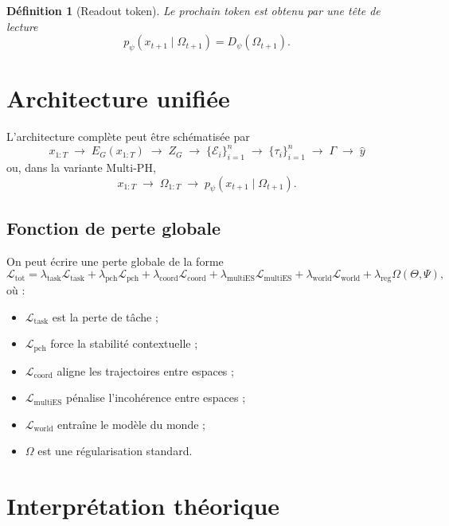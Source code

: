 \documentclass[11pt,a4paper]{article}
\newtheorem{definition}{Définition}[section]
\newcommand{\E}{\mathcal E}
\newcommand{\1}{\mathbf 1}
\begin{document}
\begin{definition}[Readout token]
Le prochain token est obtenu par une tête de lecture
\[
p_\psi(x_{t+1}\mid \Omega_{t+1})
=
D_\psi(\Omega_{t+1}).
\]
\end{definition}

\section{Architecture unifiée}

L'architecture complète peut être schématisée par
\[
x_{1:T}
\;\longrightarrow\;
E_G(x_{1:T})
\;\longrightarrow\;
Z_G
\;\longrightarrow\;
\{\E_i\}_{i=1}^n
\;\longrightarrow\;
\{\tau_i\}_{i=1}^n
\;\longrightarrow\;
\Gamma
\;\longrightarrow\;
\hat y
\]
ou, dans la variante Multi-PH,
\[
x_{1:T}
\;\longrightarrow\;
\Omega_{1:T}
\;\longrightarrow\;
p_\psi(x_{t+1}\mid \Omega_{t+1}).
\]

\subsection{Fonction de perte globale}

On peut écrire une perte globale de la forme
\[
\mathcal L_{\mathrm{tot}}
=
\lambda_{\mathrm{task}}\mathcal L_{\mathrm{task}}
+
\lambda_{\mathrm{pch}}\mathcal L_{\mathrm{pch}}
+
\lambda_{\mathrm{coord}}\mathcal L_{\mathrm{coord}}
+
\lambda_{\mathrm{multiES}}\mathcal L_{\mathrm{multiES}}
+
\lambda_{\mathrm{world}}\mathcal L_{\mathrm{world}}
+
\lambda_{\mathrm{reg}}\Omega(\Theta,\Psi),
\]
où :
\begin{itemize}[leftmargin=2em]
    \item \(\mathcal L_{\mathrm{task}}\) est la perte de tâche ;
    \item \(\mathcal L_{\mathrm{pch}}\) force la stabilité contextuelle ;
    \item \(\mathcal L_{\mathrm{coord}}\) aligne les trajectoires entre espaces ;
    \item \(\mathcal L_{\mathrm{multiES}}\) pénalise l'incohérence entre espaces ;
    \item \(\mathcal L_{\mathrm{world}}\) entraîne le modèle du monde ;
    \item \(\Omega\) est une régularisation standard.
\end{itemize}

\section{Interprétation théorique}
\end{document}
